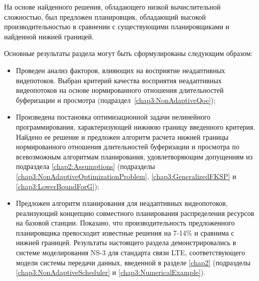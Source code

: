 На основе найденного решения, обладающего низкой вычислительной сложностью, был предложен планировщик, обладающий высокой производительностью в сравнении с существующими планировщиками и найденной нижней границей.

Основные результаты раздела могут быть сформулированы следующим образом:
\begin{itemize}
	\item Проведен анализ факторов, влияющих на восприятие неадаптивных видепотоков. Выбран критерий качества восприятия неадаптивных видеопотоков на основе нормированного отношения длительностей буферизации и просмотра (подраздел~\ref{chap3:NonAdaptiveQoe});
	\item Произведена постановка оптимизационной задачи нелинейного программирования, характеризующей нижнюю границу введенного критерия. Найдено ее решение и предложен алгоритм расчета нижней границы нормированного отношения длительностей буферизации и просмотра по всевозможным алгоритмам планирования, удовлетворяющим допущениям из подраздела \ref{chap2:Assumptions} (подразделы \ref{chap3:NonAdaptiveOptimizationProblem}, \ref{chap3:GeneralizedFKSP} и \ref{chap3:LowerBoundForG});
	\item Предложен алгоритм планирования для неадаптивных видеопотоков, реализующий концепцию совместного планирования распределения ресурсов на базовой станции. Показано, что производительность предложенного планировщика превосходит известные решения на 7-14\% и сравнима с нижней границей. Результаты настоящего раздела демонстрировались в системе моделирования NS-3 для стандарта связи LTE, соответствующего модели системы передачи данных, введенной в разделе \ref{chap2} (подразделы \ref{chap3:NonAdaptiveScheduler} и \ref{chap3:NumericalExample}).
\end{itemize}
